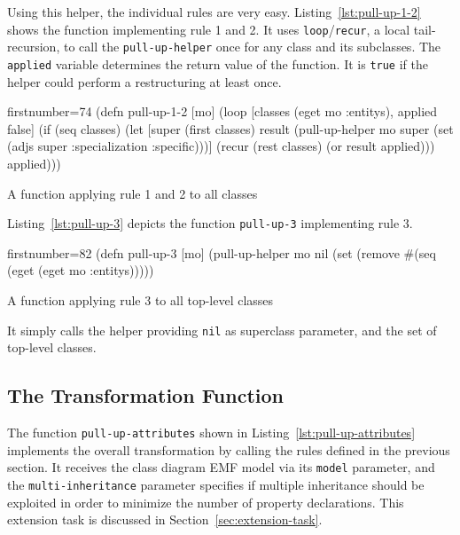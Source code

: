 \documentclass[11pt]{article}
\begin{document}
Using this helper, the individual rules are very easy.
Listing~\ref{lst:pull-up-1-2} shows the function implementing rule 1 and 2.  It
uses \verb|loop|/\verb|recur|, a local tail-recursion, to call the
\verb|pull-up-helper| once for any class and its subclasses.  The
\verb|applied| variable determines the return value of the function.  It is
\verb|true| if the helper could perform a restructuring at least once.


\begin{listing}[htbp]
  \begin{clojurecode*}{firstnumber=74}
(defn pull-up-1-2 [mo]
  (loop [classes (eget mo :entitys), applied false]
    (if (seq classes)
      (let [super (first classes)
            result (pull-up-helper
                    mo super (set (adjs super :specialization :specific)))]
        (recur (rest classes) (or result applied)))
      applied)))
  \end{clojurecode*}
  \caption{A function applying rule 1 and 2 to all classes}
    \label{lst:pull-up-1-2}
\end{listing}

Listing~\ref{lst:pull-up-3} depicts the function \verb|pull-up-3| implementing
rule 3.

\begin{listing}[htbp]
  \begin{clojurecode*}{firstnumber=82}
(defn pull-up-3 [mo]
  (pull-up-helper mo nil (set (remove #(seq (eget %
                                      (eget mo :entitys)))))
  \end{clojurecode*}
  \caption{A function applying rule 3 to all top-level classes}
    \label{lst:pull-up-3}
\end{listing}

It simply calls the helper providing \verb|nil| as superclass parameter, and
the set of top-level classes.


\subsection{The Transformation Function}
\label{sec:transf-funct}

The function \verb|pull-up-attributes| shown in
Listing~\ref{lst:pull-up-attributes} implements the overall transformation by
calling the rules defined in the previous section.  It receives the class
diagram EMF model via its \verb|model| parameter, and the
\verb|multi-inheritance| parameter specifies if multiple inheritance should be
exploited in order to minimize the number of property declarations.  This
extension task is discussed in Section~\ref{sec:extension-task}.
\end{document}
